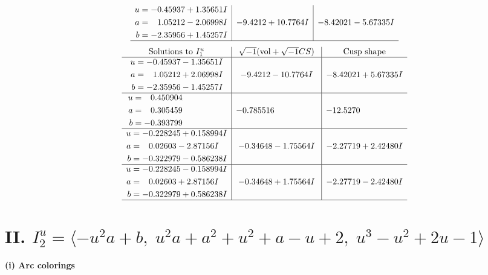 \documentclass[1p]{elsarticle_modified}
\theoremstyle{definition}
\newcommand{\I}{\sqrt{-1}}
\begin{document}
$$\begin{array}{c|c|c}
\begin{aligned}
u &= -0.45937 + 1.35651 I \\
a &= \phantom{-}1.05212 - 2.06998 I \\
b &= -2.35956 + 1.45257 I\end{aligned}
 & -9.4212 + 10.7764 I & -8.42021 - 5.67335 I\\
 \hline 
 \end{array}$$\newpage$$\begin{array}{c|c|c}  
\text{Solutions to }I^u_{1}& \I (\text{vol} + \sqrt{-1}CS) & \text{Cusp shape}\\
 \hline 
\begin{aligned}
u &= -0.45937 - 1.35651 I \\
a &= \phantom{-}1.05212 + 2.06998 I \\
b &= -2.35956 - 1.45257 I\end{aligned}
 & -9.4212 - 10.7764 I & -8.42021 + 5.67335 I \\ \hline\begin{aligned}
u &= \phantom{-}0.450904\phantom{ +0.000000I} \\
a &= \phantom{-}0.305459\phantom{ +0.000000I} \\
b &= -0.393799\phantom{ +0.000000I}\end{aligned}
 & -0.785516\phantom{ +0.000000I} & -12.5270\phantom{ +0.000000I} \\ \hline\begin{aligned}
u &= -0.228245 + 0.158994 I \\
a &= \phantom{-}0.02603 - 2.87156 I \\
b &= -0.322979 - 0.586238 I\end{aligned}
 & -0.34648 - 1.75564 I & -2.27719 + 2.42480 I \\ \hline\begin{aligned}
u &= -0.228245 - 0.158994 I \\
a &= \phantom{-}0.02603 + 2.87156 I \\
b &= -0.322979 + 0.586238 I\end{aligned}
 & -0.34648 + 1.75564 I & -2.27719 - 2.42480 I\\
 \hline 
 \end{array}$$\newpage\newpage\renewcommand{\arraystretch}{1}
\centering \section*{II. $I^u_{2}= \langle - u^2 a+b,\;u^2 a+a^2+u^2+a- u+2,\;u^3- u^2+2 u-1 \rangle$}
\flushleft \textbf{(i) Arc colorings}\\
\end{document}
